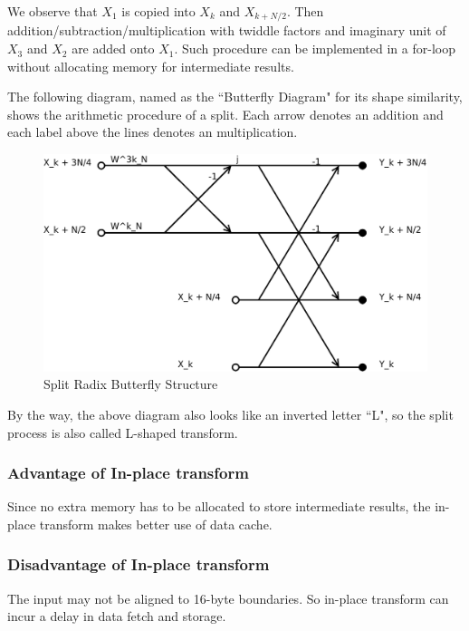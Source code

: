 \documentclass[a4paper]{report}
\begin{document}
	We observe that $X_1$ is copied into $X_k$ and $X_{k + N/2}$. Then addition/subtraction/multiplication with twiddle factors and imaginary unit of $X_3$ and $X_2$ are added onto $X_1$. Such procedure can be implemented in a for-loop without allocating memory for intermediate results.
	
	The following diagram, named as the ``Butterfly Diagram" for its shape similarity, shows the arithmetic procedure of a split. Each arrow denotes an addition and each label above the lines denotes an multiplication.
	
	\begin{figure}[htp]
		\centering
		\includegraphics[scale=0.13]{../dia/split-butterfly.png}
		\caption{Split Radix Butterfly Structure}
	\end{figure}

\newpage

	By the way, the above diagram also looks like an inverted letter ``L", so the split process is also called L-shaped transform.

\subsubsection{Advantage of In-place transform} \indent

	Since no extra memory has to be allocated to store intermediate results, the in-place transform makes better use of data cache.

\subsubsection{Disadvantage of In-place transform} \indent

	The input may not be aligned to 16-byte boundaries. So in-place transform can incur a delay in data fetch and storage.
\end{document}
